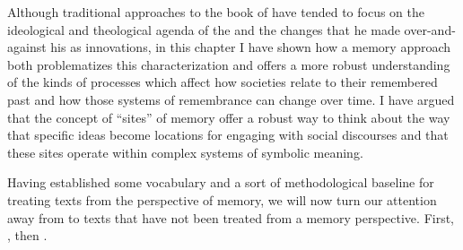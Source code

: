 Although traditional approaches to the book of \chronicles have tended to focus on the ideological and theological agenda of the \chronicler and the changes that he made over-and-against his \vorlage as innovations, in this chapter I have shown how a memory approach both problematizes this characterization and offers a more robust understanding of the kinds of processes which affect how societies relate to their remembered past and how those systems of remembrance can change over time. I have argued that the concept of ``sites'' of memory offer a robust way to think about the way that specific ideas become locations for engaging with social discourses and that these sites operate within complex systems of symbolic meaning.

Having established some vocabulary and a sort of methodological baseline for treating \rwb texts from the perspective of memory, we will now turn our attention away from \chronicles to \rwb texts that have not been treated from a memory perspective. First, \ga, then \jub.